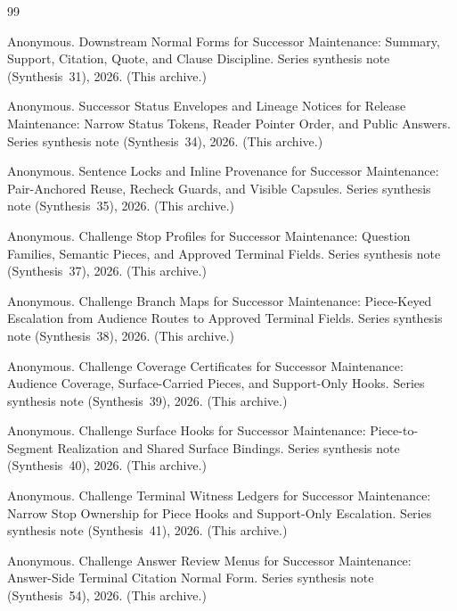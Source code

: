 \documentclass[11pt]{article}
\begin{document}
\begin{thebibliography}{99}\small

Anonymous.
\newblock Downstream Normal Forms for Successor Maintenance: Summary, Support, Citation, Quote, and Clause Discipline.
\newblock Series synthesis note (Synthesis~31), 2026. (This archive.)

Anonymous.
\newblock Successor Status Envelopes and Lineage Notices for Release Maintenance: Narrow Status Tokens, Reader Pointer Order, and Public Answers.
\newblock Series synthesis note (Synthesis~34), 2026. (This archive.)

Anonymous.
\newblock Sentence Locks and Inline Provenance for Successor Maintenance: Pair-Anchored Reuse, Recheck Guards, and Visible Capsules.
\newblock Series synthesis note (Synthesis~35), 2026. (This archive.)

Anonymous.
\newblock Challenge Stop Profiles for Successor Maintenance: Question Families, Semantic Pieces, and Approved Terminal Fields.
\newblock Series synthesis note (Synthesis~37), 2026. (This archive.)

Anonymous.
\newblock Challenge Branch Maps for Successor Maintenance: Piece-Keyed Escalation from Audience Routes to Approved Terminal Fields.
\newblock Series synthesis note (Synthesis~38), 2026. (This archive.)

Anonymous.
\newblock Challenge Coverage Certificates for Successor Maintenance: Audience Coverage, Surface-Carried Pieces, and Support-Only Hooks.
\newblock Series synthesis note (Synthesis~39), 2026. (This archive.)

Anonymous.
\newblock Challenge Surface Hooks for Successor Maintenance: Piece-to-Segment Realization and Shared Surface Bindings.
\newblock Series synthesis note (Synthesis~40), 2026. (This archive.)

Anonymous.
\newblock Challenge Terminal Witness Ledgers for Successor Maintenance: Narrow Stop Ownership for Piece Hooks and Support-Only Escalation.
\newblock Series synthesis note (Synthesis~41), 2026. (This archive.)

Anonymous.
\newblock Challenge Answer Review Menus for Successor Maintenance: Answer-Side Terminal Citation Normal Form.
\newblock Series synthesis note (Synthesis~54), 2026. (This archive.)


\end{thebibliography}
\end{document}
